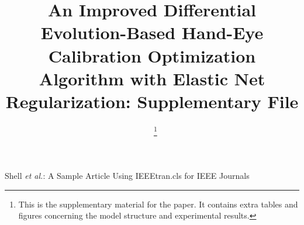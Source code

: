 \documentclass[lettersize,onecolumn]{IEEEtran}
\begin{document}
\title{An Improved Differential Evolution-Based Hand-Eye Calibration Optimization Algorithm with Elastic Net Regularization: Supplementary File}

\author{~\IEEEmembership{}
\thanks{This is the supplementary material for the paper. It contains extra tables and figures concerning the model structure and experimental results.}}%

%
{Shell \MakeLowercase{\textit{et al.}}: A Sample Article Using IEEEtran.cls for IEEE Journals}


\maketitle
\IEEEpubidadjcol
\end{document}
